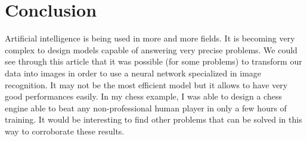 \documentclass[unnumsec,webpdf,contemporary,large]{Article}%
\theoremstyle{thmstyleone}%
\theoremstyle{thmstyletwo}%
\theoremstyle{thmstylethree}%
\begin{document}
\section{Conclusion}
Artificial intelligence is being used in more and more fields.
It is becoming very complex to design models capable of answering very precise problems.
We could see through this article that it was possible (for some problems) to transform
our data into images in order to use a neural network specialized in image recognition.
It may not be the most efficient model but it allows to have very good performances easily.
In my chess example, I was able to design a chess engine able to beat any non-professional
human player in only a few hours of training. It would be interesting to find other problems
that can be solved in this way to corroborate these results.




\end{document}
